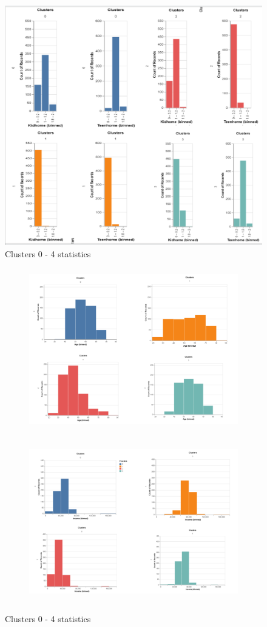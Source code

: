 \documentclass[12pt]{article}
\begin{document}
\begin{figure}[H]
    \centering
    \includegraphics[scale = 0.25]{figures/Clusters_kids.png}
    \caption{Clusters 0 - 4 statistics}
\end{figure}
\begin{figure}[H]
    \begin{subfigure}{\textwidth}
        \centering
        \includegraphics[height=7cm]{figures/Clusters_age.PNG}\hfill
    \end{subfigure}
    \newline
    \begin{subfigure}{\textwidth}
        \centering
        \includegraphics[height=7cm]{figures/Clusters_income.PNG}\hfill
    \end{subfigure}
  \caption{Clusters 0 - 4 statistics}
\end{figure}
\end{document}
